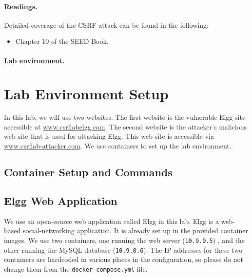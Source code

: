 \paragraph{Readings.}
Detailed coverage of the CSRF attack can be found in the following:

\begin{itemize}
\item Chapter 10 of the SEED Book, \seedbook
\end{itemize}


\paragraph{Lab environment.} 
\seedenvironmentB 
\nodependency



\section{Lab Environment Setup}

In this lab, we will use two websites. 
The first website is the vulnerable Elgg
site accessible at \url{www.csrflabelgg.com}. The second
website is the attacker's malicious web site that is used for
attacking Elgg. This web site is accessible via
\url{www.csrflab-attacker.com}. We use containers to
set up the lab environment.


\subsection{Container Setup and Commands}




\subsection{Elgg Web Application}

We use an open-source web application called Elgg in this lab.
Elgg is a web-based social-networking application.
It is already set up in the provided container images.
We use two containers, one running the web server (\texttt{10.9.0.5}) ,
and the other running the MySQL database (\texttt{10.9.0.6}).
The IP addresses for these two containers are hardcoded in various
places in the configuration, so please do not change them from
the \texttt{docker-compose.yml} file.

